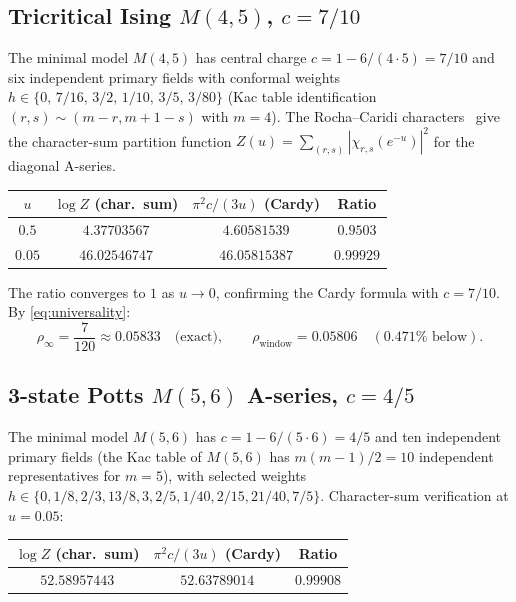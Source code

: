 \documentclass[12pt]{article}
\begin{document}
\subsection{Tricritical Ising $M(4,5)$, $c=7/10$}

The minimal model $M(4,5)$ has central charge
$c = 1 - 6/(4\cdot 5) = 7/10$ and six independent primary fields with
conformal weights
$h \in \{0,\,7/16,\,3/2,\,1/10,\,3/5,\,3/80\}$ (Kac table
identification $(r,s)\sim (m-r,m+1-s)$ with $m=4$).
The Rocha--Caridi characters~\cite{RochaCaridi1985} give the
character-sum partition function
$Z(u) = \sum_{(r,s)}|\chi_{r,s}(e^{-u})|^2$ for the diagonal A-series.

\begin{center}
\begin{tabular}{cccc}
\toprule
$u$ & $\log Z$ (char.\ sum) & $\pi^2 c/(3u)$ (Cardy) & Ratio \\
\midrule
$0.5$  & $4.37703567$ & $4.60581539$ & $0.9503$ \\
$0.05$ & $46.02546747$ & $46.05815387$ & $0.99929$ \\
\bottomrule
\end{tabular}
\end{center}

The ratio converges to $1$ as $u\to 0$, confirming the Cardy formula
with $c=7/10$.  By \eqref{eq:universality}:
\[
  \rho_{\infty} = \frac{7}{120} \approx 0.05833 \quad \text{(exact)},
  \qquad
  \rho_{\mathrm{window}} = 0.05806 \quad (0.471\%\text{ below}).
\]

\subsection{3-state Potts $M(5,6)$ A-series, $c=4/5$}

The minimal model $M(5,6)$ has $c = 1 - 6/(5\cdot 6) = 4/5$ and
ten independent primary fields (the Kac table of $M(5,6)$ has
$m(m-1)/2 = 10$ independent representatives for $m=5$), with
selected weights
$h\in\{0, 1/8, 2/3, 13/8, 3, 2/5, 1/40, 2/15, 21/40, 7/5\}$.
Character-sum verification at $u=0.05$:

\begin{center}
\begin{tabular}{ccc}
\toprule
$\log Z$ (char.\ sum) & $\pi^2 c/(3u)$ (Cardy) & Ratio \\
\midrule
$52.58957443$ & $52.63789014$ & $0.99908$ \\
\bottomrule
\end{tabular}
\end{center}
\end{document}

